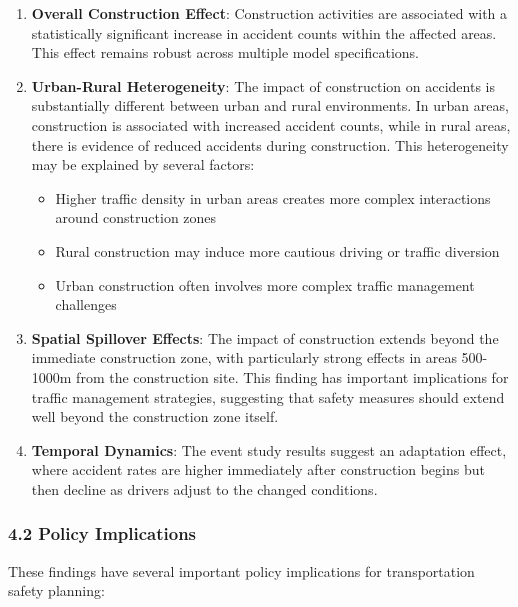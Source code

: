 \documentclass[
]{article}
\providecommand{\tightlist}{%
  \setlength{\itemsep}{0pt}\setlength{\parskip}{0pt}}
\begin{document}
\begin{enumerate}
\def\labelenumi{\arabic{enumi}.}
\item
  \textbf{Overall Construction Effect}: Construction activities are
  associated with a statistically significant increase in accident
  counts within the affected areas. This effect remains robust across
  multiple model specifications.
\item
  \textbf{Urban-Rural Heterogeneity}: The impact of construction on
  accidents is substantially different between urban and rural
  environments. In urban areas, construction is associated with
  increased accident counts, while in rural areas, there is evidence of
  reduced accidents during construction. This heterogeneity may be
  explained by several factors:

  \begin{itemize}
  \tightlist
  \item
    Higher traffic density in urban areas creates more complex
    interactions around construction zones
  \item
    Rural construction may induce more cautious driving or traffic
    diversion
  \item
    Urban construction often involves more complex traffic management
    challenges
  \end{itemize}
\item
  \textbf{Spatial Spillover Effects}: The impact of construction extends
  beyond the immediate construction zone, with particularly strong
  effects in areas 500-1000m from the construction site. This finding
  has important implications for traffic management strategies,
  suggesting that safety measures should extend well beyond the
  construction zone itself.
\item
  \textbf{Temporal Dynamics}: The event study results suggest an
  adaptation effect, where accident rates are higher immediately after
  construction begins but then decline as drivers adjust to the changed
  conditions.
\end{enumerate}

\subsubsection{4.2 Policy Implications}\label{policy-implications}

These findings have several important policy implications for
transportation safety planning:
\end{document}
